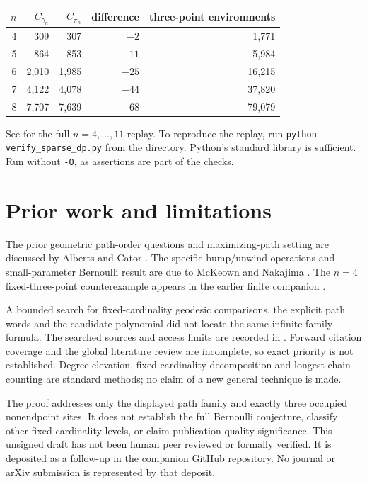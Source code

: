 \documentclass[11pt,a4paper]{article}
\begin{document}
\begin{center}
\begin{tabular}{rrrrr}
\toprule
$n$&$C_{\gamma_n}$&$C_{\pi_n}$&difference&three-point environments\\
\midrule
4&309&307&$-2$&1,771\\
5&864&853&$-11$&5,984\\
6&2,010&1,985&$-25$&16,215\\
7&4,122&4,078&$-44$&37,820\\
8&7,707&7,639&$-68$&79,079\\
\bottomrule
\end{tabular}
\end{center}
See  for the full $n=4,\ldots,11$ replay.
To reproduce the replay, run \texttt{python verify\_sparse\_dp.py} from
the  directory. Python's standard library is
sufficient. Run without \texttt{-O}, as assertions are part of the checks.

\section{Prior work and limitations}\label{sec:novelty}
The prior geometric path-order questions and maximizing-path setting
are discussed by Alberts and Cator \cite[Section~8]{AC}. The specific
bump/unwind operations and small-parameter Bernoulli result are due to
McKeown and Nakajima \cite{MN}. The $n=4$ fixed-three-point
counterexample appears in the earlier finite companion \cite{B1}.

A bounded search for fixed-cardinality geodesic comparisons, the
explicit path words and the candidate polynomial did not locate the
same infinite-family formula. The searched sources and access limits
are recorded in . Forward citation
coverage and the global literature review are incomplete, so exact
priority is not established. Degree elevation, fixed-cardinality
decomposition and longest-chain counting are standard methods; no
claim of a new general technique is made.

The proof addresses only the displayed path family and exactly three
occupied nonendpoint sites. It does not establish the full Bernoulli
conjecture, classify other fixed-cardinality levels, or claim
publication-quality significance. This unsigned draft has not been
human peer reviewed or formally verified. It is deposited as a follow-up in the companion GitHub repository.
No journal or arXiv submission is represented by that deposit.
\end{document}
